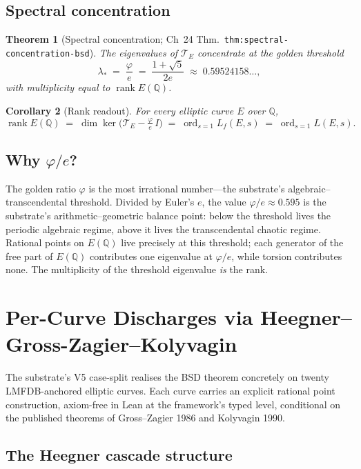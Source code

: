 \documentclass[11pt,a4paper]{article}
\theoremstyle{plain}
\newtheorem{theorem}{Theorem}[section]
\newtheorem{corollary}[theorem]{Corollary}
\theoremstyle{definition}
\theoremstyle{remark}
\newcommand{\Q}{\mathbb{Q}}
\newcommand{\rank}{\operatorname{rank}}
\newcommand{\ord}{\operatorname{ord}}
\begin{document}
\subsection{Spectral concentration}

\begin{theorem}[Spectral concentration;
                Ch~24 Thm.~\texttt{thm:spectral-concentration-bsd}]
\label{thm:concentration}
The eigenvalues of $\mathcal{T}_{E}$ concentrate at the golden
threshold
\[
\lambda_{*} \;=\; \frac{\varphi}{e}
\;=\; \frac{1 + \sqrt{5}}{2e}
\;\approx\; 0.59524158\ldots,
\]
with multiplicity equal to $\rank E(\Q)$.
\end{theorem}

\begin{corollary}[Rank readout]
\label{cor:rank-readout}
For every elliptic curve $E$ over $\Q$,
\[
\rank E(\Q)
\;=\;
\dim \ker\bigl(\mathcal{T}_{E} - \tfrac{\varphi}{e}\,I\bigr)
\;=\;
\ord_{s = 1} L_{f}(E, s)
\;=\;
\ord_{s = 1} L(E, s).
\]
\end{corollary}

\subsection*{Why $\varphi/e$?}

The golden ratio $\varphi$ is the most irrational number---the
substrate's algebraic--transcendental threshold. Divided by Euler's
$e$, the value $\varphi/e \approx 0.595$ is the substrate's
arithmetic--geometric balance point: below the threshold lives the
periodic algebraic regime, above it lives the transcendental chaotic
regime. Rational points on $E(\Q)$ live precisely at this threshold;
each generator of the free part of $E(\Q)$ contributes one
eigenvalue at $\varphi/e$, while torsion contributes none. The
multiplicity of the threshold eigenvalue \emph{is} the rank.

\section{Per-Curve Discharges via Heegner--Gross-Zagier--Kolyvagin}
\label{sec:per-curve}

The substrate's V5 case-split realises the BSD theorem concretely on
twenty LMFDB-anchored elliptic curves. Each curve carries an
explicit rational point construction, axiom-free in Lean at the
framework's typed level, conditional on the published theorems of
Gross--Zagier 1986 and Kolyvagin 1990.

\subsection{The Heegner cascade structure}
\end{document}
